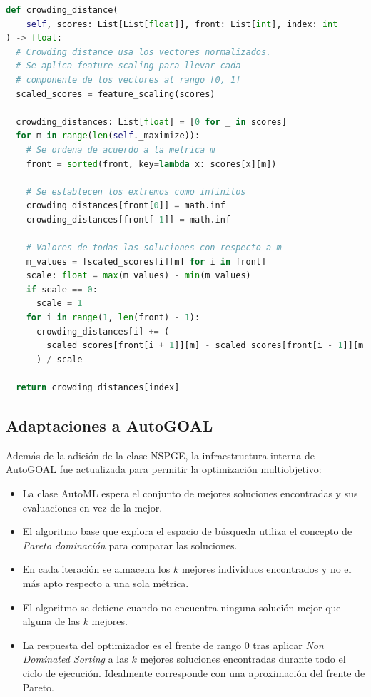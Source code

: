 \begin{lstlisting}[caption=Selecci\'on seg\'un estimaci\'on de densidad, language=Python]
def crowding_distance(
    self, scores: List[List[float]], front: List[int], index: int
) -> float:
  # Crowding distance usa los vectores normalizados.
  # Se aplica feature scaling para llevar cada
  # componente de los vectores al rango [0, 1]
  scaled_scores = feature_scaling(scores)

  crowding_distances: List[float] = [0 for _ in scores]
  for m in range(len(self._maximize)):
    # Se ordena de acuerdo a la metrica m
    front = sorted(front, key=lambda x: scores[x][m])

    # Se establecen los extremos como infinitos
    crowding_distances[front[0]] = math.inf
    crowding_distances[front[-1]] = math.inf

    # Valores de todas las soluciones con respecto a m 
    m_values = [scaled_scores[i][m] for i in front]
    scale: float = max(m_values) - min(m_values)
    if scale == 0:
      scale = 1
    for i in range(1, len(front) - 1):
      crowding_distances[i] += (
        scaled_scores[front[i + 1]][m] - scaled_scores[front[i - 1]][m]
      ) / scale

  return crowding_distances[index]
\end{lstlisting}

\subsection{Adaptaciones a AutoGOAL}
Adem\'as de la adici\'on de la clase NSPGE, la infraestructura interna de AutoGOAL fue actualizada para permitir la optimizaci\'on multiobjetivo:
\begin{itemize}
    \item La clase AutoML espera el conjunto de mejores soluciones encontradas y sus evaluaciones en vez de la mejor.
    \item El algoritmo base que explora el espacio de b\'usqueda utiliza el concepto de \textit{Pareto dominaci\'on} para comparar las soluciones.
    \item En cada  iteraci\'on se almacena los $k$ mejores individuos encontrados y no el m\'as apto respecto a una sola m\'etrica.
    \item El algoritmo se detiene cuando no encuentra ninguna soluci\'on mejor que alguna de las $k$ mejores.
    \item La respuesta del optimizador es el frente de rango $0$ tras aplicar \textit{Non Dominated Sorting} a las $k$ mejores soluciones encontradas durante todo el ciclo de ejecuci\'on. Idealmente corresponde con una aproximaci\'on del frente de Pareto.
\end{itemize}

